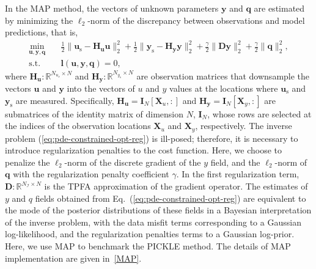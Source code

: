 \documentclass{agujournal2019}
\begin{document}
In the MAP method, the vectors of unknown parameters $\mathbf{y}$  and $\mathbf{q}$ are estimated by minimizing the $\ell_2$-norm of the discrepancy between observations and model predictions, that is,
%
\begin{equation}
  \label{eq:pde-constrained-opt-reg}
  \begin{aligned}
    \min_{\mathbf{u}, \mathbf{y}, \mathbf{q}} \quad & \frac{1}{2} \| \mathbf{u}_{\mathrm{s}} - \mathbf{H}_{\mathbf{u}} \mathbf{u} \|^2_2 + \frac{1}{2} \| \mathbf{y}_{\mathrm{s}} - \mathbf{H}_{\mathbf{y}} \mathbf{y} \|^2_2 + \frac{\gamma}{2} \| \mathbf{D} \mathbf{y} \|^2_2 + \frac{\gamma}{2} \| \mathbf{q} \|^2_2, \\
    \text{s.t.} \quad & \mathbf{l}(\mathbf{u}, \mathbf{y}, \mathbf{q}) = 0,
  \end{aligned}
\end{equation}
%
where $\mathbf{H}_{\mathbf{u}} \colon \mathbb{R}^{N_{u_s} \times N}$ and $\mathbf{H}_{\mathbf{y}} \colon \mathbb{R}^{N_{y_s} \times N}$ are observation matrices that downsample the vectors $\mathbf{u}$ and $\mathbf{y}$ into the vectors of $u$ and $y$ values at the locations  where $\mathbf{u}_{\mathrm{s}}$ and $\mathbf{y}_{\mathrm{s}}$ are measured. Specifically, $\mathbf{H}_{\mathbf{u}} = \mathbf{I}_N [\mathbf{X}_u, :]$ and $\mathbf{H}_{\mathbf{y}} = \mathbf{I}_N [\mathbf{X}_y, :]$ are submatrices of the identity matrix of dimension $N$, $\mathbf{I}_N$, whose rows are selected at the indices of the observation locations $\mathbf{X}_u$ and $\mathbf{X}_y$, respectively.
%
The inverse problem (\ref{eq:pde-constrained-opt-reg}) is ill-posed; therefore, it is necessary to introduce regularization penalties to the cost function.
Here, we choose to penalize the $\ell_2$-norm of the discrete gradient of the $y$ field, and the $\ell_2$-norm of $\mathbf{q}$
%
%
with the regularization penalty coefficient $\gamma$. In the first regularization term, $\mathbf{D} \colon \mathbb{R}^{N_{\mathcal{I}} \times N}$ is the TPFA approximation of the gradient operator.
The estimates of $y$ and $q$ fields obtained from  Eq.~(\ref{eq:pde-constrained-opt-reg}) are equivalent to the mode of the posterior distributions of these fields in a Bayesian interpretation of the inverse problem, with the data misfit terms corresponding to a Gaussian log-likelihood, and the regularization penalties terms to a Gaussian log-prior.
Here, we use MAP to benchmark the PICKLE method.
The details of MAP implementation are given in~\ref{MAP}.
\end{document}
